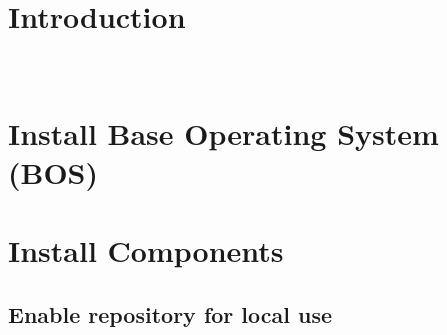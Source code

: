 \documentclass[letterpaper]{article}
\begin{document}
 

\newpage
\tableofcontents
\newpage


\section{Introduction} \label{sec:introduction}

 \\








\section{Install Base Operating System (BOS)}



\section{Install \OHPC{} Components} \label{sec:basic_install}


\subsection{Enable \OHPC{} repository for local use} \label{sec:enable_repo}



\end{document}
